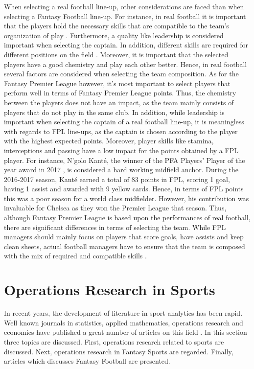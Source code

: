 When selecting a real football line-up, other considerations are faced than when selecting a Fantasy Football line-up. For instance, in real football it is important that the players hold the necessary skills that are compatible to the team's organization of play \citep{Pantuso}. Furthermore, a quality like leadership is considered important when selecting the captain. In addition, different skills are required for different positions on the field \citep{Boon}. Moreover, it is important that the selected players have a good chemistry and play each other better. Hence, in real football several factors are considered when selecting the team composition. As for the Fantasy Premier League however, it's most important to select players that perform well in terms of Fantasy Premier League points. Thus, the chemistry between the players does not have an impact, as the team mainly consists of players that do not play in the same club. In addition, while leadership is important when selecting the captain of a real football line-up, it is meaningless with regards to FPL line-ups, as the captain is chosen according to the player with the highest expected points. Moreover, player skills like stamina, interceptions and passing have a low impact for the points obtained by a FPL player. For instance, N'golo Kant\'e, the winner of the PFA Players' Player of the year award in 2017 \citep{Skysports_Kante}, is considered a hard working midfield anchor. During the 2016-2017 season, Kant\'e earned a total of 83 points in FPL, scoring 1 goal, having 1 assist and awarded with 9 yellow cards. Hence, in terms of FPL points this was a poor season for a world class midfielder. However, his contribution was invaluable for Chelsea as they won the Premier League that season. Thus, although Fantasy Premier League is based upon the performances of real football, there are significant differences in terms of selecting the team. While FPL managers should mainly focus on players that score goals, have assists and keep clean sheets, actual football managers have to ensure that the team is composed with the mix of required and compatible skills \citep{Pantuso}.



\section{Operations Research in Sports} \label{Opt_Models_for_Fantasy_Sports}


In recent years, the development of literature in sport analytics has been rapid. Well known journals in statistics, applied mathematics, operations research and economics have published a great number of articles on this field \citep{Coleman}. In this section three topics are discussed. First, operations research related to sports are discussed. Next, operations research in Fantasy Sports are regarded. Finally, articles which discusses Fantasy Football are presented. 

